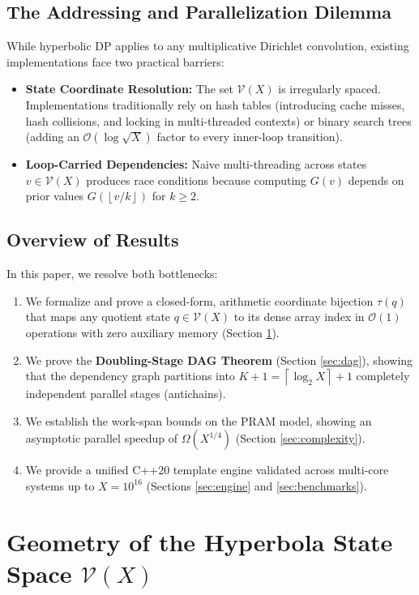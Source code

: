 \documentclass[11pt,a4paper]{article}
\theoremstyle{plain}
\theoremstyle{definition}
\newcommand{\V}{\mathcal{V}}
\newcommand{\Oh}{\mathcal{O}}
\newcommand{\floor}[1]{\left\lfloor #1 \right\rfloor}
\newcommand{\ceil}[1]{\left\lceil #1 \right\rceil}
\begin{document}
\subsection{The Addressing and Parallelization Dilemma}
While hyperbolic DP applies to any multiplicative Dirichlet convolution, existing implementations face two practical barriers:
\begin{itemize}
    \item \textbf{State Coordinate Resolution:} The set $\V(X)$ is irregularly spaced. Implementations traditionally rely on hash tables (introducing cache misses, hash collisions, and locking in multi-threaded contexts) or binary search trees (adding an $\Oh(\log \sqrt{X})$ factor to every inner-loop transition).
    \item \textbf{Loop-Carried Dependencies:} Naive multi-threading across states $v \in \V(X)$ produces race conditions because computing $G(v)$ depends on prior values $G(\floor{v/k})$ for $k \ge 2$.
\end{itemize}

\subsection{Overview of Results}
In this paper, we resolve both bottlenecks:
\begin{enumerate}
    \item We formalize and prove a closed-form, arithmetic coordinate bijection $\tau(q)$ that maps any quotient state $q \in \V(X)$ to its dense array index in $\Oh(1)$ operations with zero auxiliary memory (Section \ref{sec:geometry}).
    \item We prove the \textbf{Doubling-Stage DAG Theorem} (Section \ref{sec:dag}), showing that the dependency graph partitions into $K + 1 = \ceil{\log_2 X} + 1$ completely independent parallel stages (antichains).
    \item We establish the work-span bounds on the PRAM model, showing an asymptotic parallel speedup of $\Omega(X^{1/4})$ (Section \ref{sec:complexity}).
    \item We provide a unified C++20 template engine validated across multi-core systems up to $X = 10^{16}$ (Sections \ref{sec:engine} and \ref{sec:benchmarks}).
\end{enumerate}


\section{Geometry of the Hyperbola State Space $\V(X)$}
\label{sec:geometry}
\end{document}
